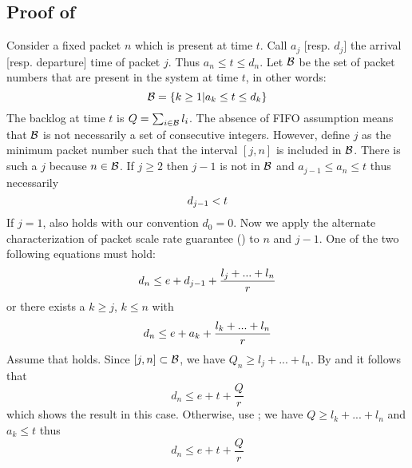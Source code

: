 \subsection{Proof of }
Consider a fixed packet $n$ which is present at time $t$. Call
$a_j$ [resp. $d_j$] the arrival [resp. departure] time of
packet $j$. Thus $a_n\leq t \leq d_n$. Let $\mathcal B$ be the set
of packet numbers that are present in the system at time $t$,
in other words:
$$
\mathcal B = \left\{k \geq 1 | a_k \leq t \leq d_k \right\}
$$
The backlog at time $t$ is $ Q= \sum_{i \in \mathcal B} l_i$. The
absence of FIFO assumption means that $\mathcal B$ is not
necessarily a set of consecutive integers. However, define $j$
as the minimum packet number such that the interval $[j,n]$ is
included in $\mathcal B$. There is such a $j$ because $n \in
\mathcal B$. If $j \geq 2$ then $j-1$ is not in $\mathcal B$ and
$a_{j-1} \leq a_n \leq t$ thus necessarily
\begin{equation}\mylabel{eq-kjas881}
 d_{j-1} < t
\end{equation}
If $j=1$,  also holds with our convention
$d_0=0$. Now we apply the alternate characterization of packet
scale rate guarantee () to $n$ and
$j-1$. One of the two following equations must hold:
\begin{equation}\mylabel{eq-myxpoik21}
  d_n \leq e + d_{j-1} + \frac{l_j + ... + l_n}{r}
\end{equation}
or there exists a $k \geq j$, $k\leq n$ with
\begin{equation}\mylabel{eq-myxpoik22}
  d_n \leq e + a_{k} + \frac{l_k + ... + l_n}{r}
\end{equation}
Assume that  holds. Since $[j,n] \subset
\mathcal B$, we have $Q_n \geq l_j + ... + l_n $. By
 and  it follows that
$$
 d_n \leq e + t + \frac{Q}{r}
$$ which shows the result in this case. Otherwise, use
; we have $Q \geq l_k + ... + l_n$ and $a_k
\leq t$ thus
$$
 d_n \leq e + t + \frac{Q}{r}
$$

